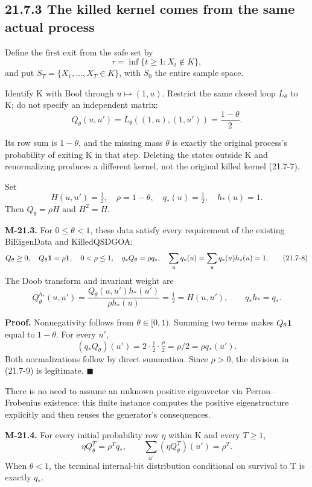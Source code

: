 \documentclass[
  english,
  11pt,
  oneside]{book}
\begin{document}
\subsection{21.7.3 The killed kernel comes from the same actual process}\label{the-killed-kernel-comes-from-the-same-actual-process}

Define the first exit from the safe set by \[\tau=\inf\{t\ge1:X_t\notin K\},\] and put \(S_T=\{X_1,\ldots,X_T\in K\}\), with \(S_0\) the entire sample space.

Identify K with Bool through \(u\mapsto(1,u)\). Restrict the same closed loop \(L_\theta\) to K; do not specify an independent matrix: \[Q_\theta(u,u')=L_\theta((1,u),(1,u'))=\frac{1-\theta}{2}. \tag{21.7-7}\]

Its row sum is \(1-\theta\), and the missing mass \(\theta\) is exactly the original process's probability of exiting K in that step. Deleting the states outside K and renormalizing produces a different kernel, not the original killed kernel (21.7-7).

Set \[H(u,u')=\tfrac12,\quad \rho=1-\theta,\quad
q_*(u)=\tfrac12,\quad h_*(u)=1.\] Then \(Q_\theta=\rho H\) and \(H^2=H\).

\hypertarget{m-21-3}{}\label{m-21-3}

\textbf{M-21.3.} For \(0\le\theta<1\), these data satisfy every requirement of the existing BiEigenData and KilledQSDGOA: \[Q_\theta\ge0,\quad Q_\theta{\bf1}=\rho{\bf1},\quad
0<\rho\le1,\quad q_*Q_\theta=\rho q_*,
\quad \sum_uq_*(u)=\sum_uq_*(u)h_*(u)=1.              \tag{21.7-8}\] The Doob transform and invariant weight are \[Q_\theta^{h_*}(u,u')
=\frac{Q_\theta(u,u')h_*(u')}{\rho h_*(u)}
=\tfrac12=H(u,u'),\qquad q_*h_*=q_*.                 \tag{21.7-9}\]

\textbf{Proof.} Nonnegativity follows from \(\theta\in[0,1)\). Summing two terms makes \(Q_\theta{\bf1}\) equal to \(1-\theta\). For every \(u'\), \[(q_*Q_\theta)(u')=2\cdot\tfrac12\cdot\tfrac{\rho}{2}
=\rho/2=\rho q_*(u').\] Both normalizations follow by direct summation. Since \(\rho>0\), the division in (21.7-9) is legitimate. \(\blacksquare\)

There is no need to assume an unknown positive eigenvector via Perron--Frobenius existence: this finite instance computes the positive eigenstructure explicitly and then reuses the generator's consequences.

\hypertarget{m-21-4}{}\label{m-21-4}

\textbf{M-21.4.} For every initial probability row \(\eta\) within K and every \(T\ge1\), \[\eta Q_\theta^T=\rho^Tq_*,\qquad
\sum_{u'}(\eta Q_\theta^T)(u')=\rho^T.                \tag{21.7-10}\] When \(\theta<1\), the terminal internal-bit distribution conditional on survival to T is exactly \(q_*\).
\end{document}
